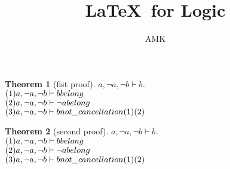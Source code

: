 \documentclass[11pt]{article}
\title{\textbf{\LaTeX\ for Logic}}
\author{AMK}
\newtheorem{theorem}{Theorem}
\def\turn{\vdash}
\begin{document}
\maketitle
\begin{theorem}[fist proof] $ a, \neg a, \neg b \turn b $.\\
$(1)a, \neg a, \neg b \turn b \hfill belong $\\
$(2)a, \neg a, \neg b \turn \neg a \hfill belong $\\
$(3)a, \neg a, \neg b \turn b \hfill not \_ cancellation (1)(2) $\\
\end{theorem}
\begin{theorem}[second proof] $ a, \neg a, \neg b \turn b $.\\
$(1)a, \neg a, \neg b \turn b \hfill belong $\\
$(2)a, \neg a, \neg b \turn \neg a \hfill belong $\\
$(3)a, \neg a, \neg b \turn b \hfill not \_ cancellation (1)(2) $\\
\end{theorem}
\end{document}
